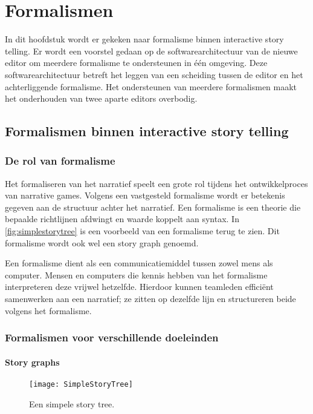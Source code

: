 \chapter{Formalismen}
\label{ch:formalism}
In dit hoofdstuk wordt er gekeken naar formalisme binnen interactive story telling. Er wordt een voorstel gedaan op de softwarearchitectuur van de nieuwe editor om meerdere formalisme te ondersteunen in één omgeving. Deze softwarearchitectuur betreft het leggen van een scheiding tussen de editor en het achterliggende formalisme. Het ondersteunen van meerdere formalismen maakt het onderhouden van twee aparte editors overbodig.

\section{Formalismen binnen interactive story telling}
\subsection{De rol van formalisme}
Het formaliseren van het narratief speelt een grote rol tijdens het ontwikkelproces van narrative games. Volgens een vastgesteld formalisme wordt er betekenis gegeven aan de structuur achter het narratief. Een formalisme is een theorie die bepaalde richtlijnen afdwingt en waarde koppelt aan syntax. In \autoref{fig:simplestorytree} is een voorbeeld van een formalisme terug te zien. Dit formalisme wordt ook wel een story graph genoemd.

Een formalisme dient als een communicatiemiddel tussen zowel mens als computer. Mensen en computers die kennis hebben van het formalisme interpreteren deze vrijwel hetzelfde. Hierdoor kunnen teamleden efficiënt samenwerken aan een narratief; ze zitten op dezelfde lijn en structureren beide volgens het formalisme.

\subsection{Formalismen voor verschillende doeleinden}
\subsubsection{Story graphs}

\begin{wrapfigure}{r}{0.4\textwidth}
    \centering
    \texttt{[image: SimpleStoryTree]}
    \caption[]{Een simpele story tree. \footnotemark}
    \label{fig:simplestorytree}
\end{wrapfigure}


